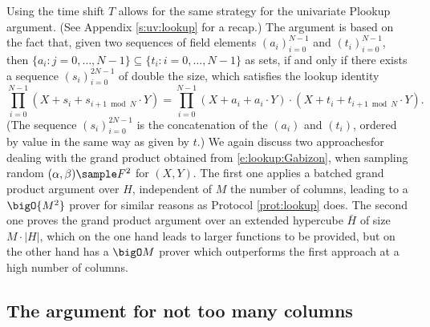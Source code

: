 \documentclass[11pt]{article}
\theoremstyle{definition}
\theoremstyle{remark}
\begin{document}
Using the time shift $T$ allows for the same strategy for the univariate Plookup argument. (See Appendix \ref{s:uv:lookup} for a recap.)
The argument is based on the fact that, given two sequences of field elements $(a_i)_{i=0}^{N-1}$ and $(t_i)_{i=0}^{N-1}$, then $\{a_i : j= 0,\ldots, N-1\}\subseteq \{t_i : i = 0, \ldots, N-1\}$ as sets, if and only if there exists a sequence $(s_i)_{i=0}^{2N-1}$ of double the size, which satisfies the lookup identity
\begin{equation}
\label{e:lookup:Gabizon}
\prod_{i=0}^{N-1} (X + s_{i}+ s_{i+1\bmod N}\cdot Y)
= \prod_{i=0}^{N-1}  (X + a_i + a_i\cdot Y)\cdot (X + t_i + t_{i+1\bmod N}\cdot Y).
\end{equation}
(The sequence $(s_i)_{i=0}^{2N-1}$ is  the concatenation of the $(a_i)$ and $(t_i)$, ordered by value in the same way as given by $t$.)
We again discuss two approaches\footnotemark for dealing with the grand product obtained from \eqref{e:lookup:Gabizon}, when sampling random $(\alpha, \beta)\sample F^2$ for $(X,Y)$.
The first one applies a batched grand product argument over $H$, independent of $M$ the number of columns, leading to a $\bigO{M^2}$ prover for similar reasons as Protocol \ref{prot:lookup} does.
The second one proves the grand product argument over an extended hypercube $\bar H$ of size $M\cdot |H|$, which on the one hand leads to larger functions to be provided, but on the other hand has a $\bigO M$ prover which outperforms the first approach at a high number of columns.

 

\subsection{The argument for not too many columns}
\label{s:hyperplonk:small}
\end{document}
